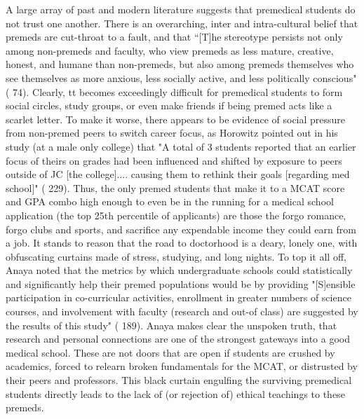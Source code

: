 \documentclass [12pt]{article}
\begin{document}
\begin{flushleft}
A large array of past and modern literature suggests that premedical students do not trust one another. There is an overarching, inter and intra-cultural belief that premeds are cut-throat to a fault, and that {``}[T]he stereotype persists not only among non-premeds and faculty, who view premeds as less mature, creative, honest, and humane than non-premeds, but also among premeds themselves who see themselves as more anxious, less socially active, and less politically conscious" (\cite{Olsen-2016} 74). Clearly, tt becomes exceedingly difficult for premedical students to form social circles, study groups, or even make friends if being premed acts like a scarlet letter. To make it worse, there appears to be evidence of social pressure from non-premed peers to switch career focus, as Horowitz pointed out in his study (at a male only college) that "A total of 3 students reported that an earlier focus of theirs on grades had been influenced and shifted by exposure to peers outside of JC [the college].... causing them to rethink their goals [regarding med school]" (\cite{Horowitz-2010} 229). Thus, the only premed students that make it to a MCAT score and GPA combo high enough to even be in the running for a medical school application (the top 25th percentile of applicants) are those the forgo romance, forgo clubs and sports, and sacrifice any expendable income they could earn from a job. It stands to reason that the road to doctorhood is a deary, lonely one, with obfuscating curtains made of stress, studying, and long nights. To top it all off, Anaya noted that the metrics by which undergraduate schools could statistically and significantly help their premed populations would be by providing "[S]ensible participation in co-curricular activities, enrollment in greater numbers of science courses, and involvement with faculty (research and out-of class) are suggested by the results of this study" (\cite{Anaya-2001} 189).
Anaya makes clear the unspoken truth, that research and personal connections are one of the strongest gateways into a good medical school. These are not doors that are open if students are crushed by academics, forced to relearn broken fundamentals for the MCAT, or distrusted by their peers and professors. This black curtain engulfing the surviving premedical students directly leads to the lack of (or rejection of) ethical teachings to these premeds.


\end{flushleft}
\end{document}
